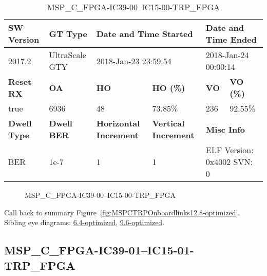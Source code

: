 \begin{table}[h]
\centering
\caption{MSP\_C\_FPGA-IC39-00--IC15-00-TRP\_FPGA}
\label{tab:MSPCFPGAIC3900IC1500TRPFPGA12.8-optimized}
\begin{tabular}{@{}|l|l|l|l|l|l|@{}}
\toprule
\textbf{SW Version}                & \textbf{GT Type}   & \multicolumn{2}{l|}{\textbf{Date and Time Started}}            & \multicolumn{2}{l|}{\textbf{Date and Time Ended}}        \\ \midrule
2017.2                       & UltraScale GTY          & \multicolumn{2}{l|}{2018-Jan-23 23:59:54}                   & \multicolumn{2}{l|}{2018-Jan-24 00:00:14}               \\ \midrule
\textbf{Reset RX}                  & \textbf{OA} & \textbf{HO}   & \textbf{HO (\%)} & \textbf{VO} & \textbf{VO (\%)} \\ \midrule
true & 6936        & 48          & 73.85\%        & 236        & 92.55\%       \\ \midrule
\textbf{Dwell Type}                & \textbf{Dwell BER} & \textbf{Horizontal Increment} & \textbf{Vertical Increment}    & \multicolumn{2}{l|}{\textbf{Misc Info}}                  \\ \midrule
BER                            & 1e-7        & 1        & 1           & \multicolumn{2}{l|}{ELF Version: 0x4002 SVN: 0}                         \\ \bottomrule
\end{tabular}
\end{table}

\begin{figure}[h]
\caption{MSP\_C\_FPGA-IC39-00--IC15-00-TRP\_FPGA} \label{fig:MSPCFPGAIC3900IC1500TRPFPGA12.8-optimized}
\end{figure}

Call back to summary Figure~\ref{fig:MSPCTRPOnboardlinks12.8-optimized}.
Sibling eye diagrams: \hyperref[sec:MSPCFPGAIC3900IC1500TRPFPGA6.4-optimized]{6.4-optimized}, \hyperref[sec:MSPCFPGAIC3900IC1500TRPFPGA9.6-optimized]{9.6-optimized}.

\clearpage
\newpage


\subsection{MSP\_C\_FPGA-IC39-01--IC15-01-TRP\_FPGA}\label{sec:MSPCFPGAIC3901IC1501TRPFPGA12.8-optimized}

